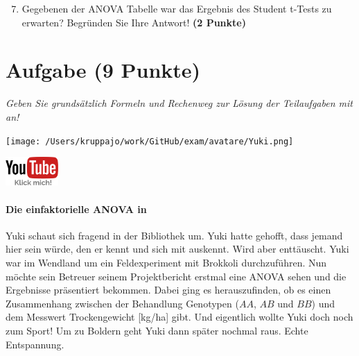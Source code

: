 \documentclass[a4paper, 9pt]{scrartcl}\usepackage[]{graphicx}\usepackage[]{xcolor}
\begin{document}
\begin{enumerate}
  \setcounter{enumi}{6}
\item Gegebenen der ANOVA Tabelle war das Ergebnis des Student t-Tests zu erwarten? Begründen Sie Ihre Antwort! \textbf{(2 Punkte)}
\end{enumerate}

 
\clearpage

\section{Aufgabe \hfill (9 Punkte)}

\textit{Geben Sie grundsätzlich Formeln und Rechenweg zur Lösung der Teilaufgaben mit an!} \\[1Ex]
 

 
\begin{minipage}[t]{0.5\textwidth}
\texttt{[image: /Users/kruppajo/work/GitHub/exam/avatare/Yuki.png]}
\end{minipage}
\begin{minipage}[t]{0.5\textwidth}
\hfill
\href{https://youtu.be/aXvxGC4YLqk}{\includegraphics[width = 2cm]{img/youtube}}
\end{minipage}
\vspace{-3Ex}



\paragraph{Die einfaktorielle ANOVA in \Rlogo}

Yuki schaut sich fragend in der Bibliothek um. Yuki hatte gehofft, dass jemand hier sein würde, den er kennt und sich mit \Rlogo auskennt. Wird aber enttäuscht. Yuki war im Wendland um ein Feldexperiment mit Brokkoli durchzuführen. Nun möchte sein Betreuer seinem Projektbericht erstmal eine ANOVA sehen und die Ergebnisse präsentiert bekommen. Dabei ging es herauszufinden, ob es einen Zusammenhang zwischen der Behandlung Genotypen ($AA$, $AB$ und $BB$) und dem Messwert Trockengewicht [kg/ha] gibt. Und eigentlich wollte Yuki doch noch zum Sport! Um zu Boldern geht Yuki dann später nochmal raus. Echte Entspannung.
\end{document}
